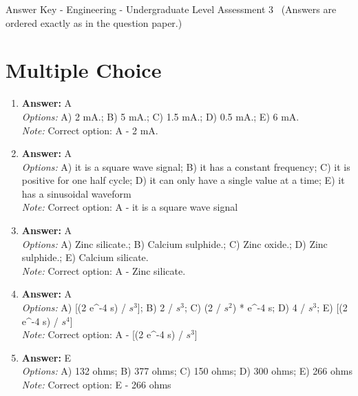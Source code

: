 \documentclass[12pt]{article}
\begin{document}
\begin{center}
Answer Key - Engineering - Undergraduate Level Assessment 3 \
\small (Answers are ordered exactly as in the question paper.)
\end{center}

\section*{Multiple Choice}
\begin{enumerate}[label=\arabic*.]
\item \textbf{Answer:} A
\\ \textit{Options:} A) 2 mA.; B) 5 mA.; C) 1.5 mA.; D) 0.5 mA.; E) 6 mA.
\\ \textit{Note:} Correct option: A - 2 mA.
\item \textbf{Answer:} A
\\ \textit{Options:} A) it is a square wave signal; B) it has a constant frequency; C) it is positive for one half cycle; D) it can only have a single value at a time; E) it has a sinusoidal waveform
\\ \textit{Note:} Correct option: A - it is a square wave signal
\item \textbf{Answer:} A
\\ \textit{Options:} A) Zinc silicate.; B) Calcium sulphide.; C) Zinc oxide.; D) Zinc sulphide.; E) Calcium silicate.
\\ \textit{Note:} Correct option: A - Zinc silicate.
\item \textbf{Answer:} A
\\ \textit{Options:} A) [(2 e^-4 s) / $s^3$]; B) 2 / $s^3$; C) (2 / $s^2$) * e^-4 s; D) 4 / $s^3$; E) [(2 e^-4 s) / $s^4$]
\\ \textit{Note:} Correct option: A - [(2 e^-4 s) / $s^3$]
\item \textbf{Answer:} E
\\ \textit{Options:} A) 132 ohms; B) 377 ohms; C) 150 ohms; D) 300 ohms; E) 266 ohms
\\ \textit{Note:} Correct option: E - 266 ohms
\end{enumerate}
\end{document}
